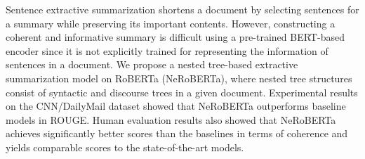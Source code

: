 Sentence extractive summarization shortens a document by selecting sentences for a summary while preserving its important contents. However, constructing a coherent and informative summary is difficult using a pre-trained BERT-based encoder since it is not explicitly trained for representing the information of sentences in a document. We propose a nested tree-based extractive summarization model on RoBERTa (NeRoBERTa), where nested tree structures consist of syntactic and discourse trees in a given document. Experimental results on the CNN/DailyMail dataset showed that NeRoBERTa outperforms baseline models in ROUGE. Human evaluation results also showed that NeRoBERTa achieves significantly better scores than the baselines in terms of coherence and yields comparable scores to the state-of-the-art models.

